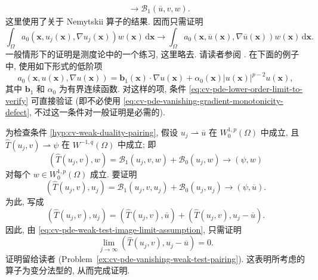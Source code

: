 \begin{Proof}
\[\begin{aligned}
&\to\mathcal{B}_1(\overline u,v,w).
\end{aligned}\]这里使用了关于 Nemytskii 算子的结果. 因而只需证明
\begin{equation}\label{eq:cv-pde-lower-order-limit-to-verify}
\int_\Omega a_0(\bm{x},u_j(\bm{x}),\nabla u_j(\bm{x}))w(\bm{x})\,\mathrm{d}\bm{x}\to\int_\Omega a_0(\bm{x},\overline u(\bm{x}),\nabla\overline u(\bm{x}))w(\bm{x})\,\mathrm{d}\bm{x}.
\end{equation}
一般情形下的证明是测度论中的一个练习, 这里略去. 请读者参阅 \cite[Lemma 2.2, p.~184]{Li}. 在下面的例子中, 使用如下形式的低阶项
\begin{equation}\label{eq:cv-pde-linear-drift-p-power-lower-order-term}
a_0(\bm{x},u(\bm{x}),\nabla u(\bm{x}))=\bm{b}_1(\bm{x})\cdot\nabla u(\bm{x})+\alpha_0(\bm{x})|u(\bm{x})|^{p-2}u(\bm{x}),
\end{equation}
其中 $\bm{b}_1$ 和 $\alpha_0$ 为有界连续函数. 对这样的项, 条件 \eqref{eq:cv-pde-lower-order-limit-to-verify} 可直接验证 (即不必使用 \eqref{eq:cv-pde-vanishing-gradient-monotonicity-defect}, 不过这一条件对一般证明是必需的).

为检查条件 \ref{hyp:cv-weak-duality-pairing}, 假设 $u_j\rightharpoonup\overline u$ 在 $W_0^{1,p}(\Omega)$ 中成立, 且 $\widehat T(u_j,v)\rightharpoonup\psi$ 在 $W^{-1,q}(\Omega)$ 中成立; 即
\begin{equation}\label{eq:cv-pde-weak-test-image-limit-assumption}
(\widehat T(u_j,v),w)=\mathcal{B}_1(u_j,v,w)+\mathcal{B}_0(u_j,w)\to(\psi,w)
\end{equation}
对每个 $w\in W_0^{1,p}(\Omega)$ 成立. 要证明
\begin{equation}\label{eq:cv-pde-weak-duality-pairing-limit-goal}
(\widehat T(u_j,v),u_j)=\mathcal{B}_1(u_j,v,u_j)+\mathcal{B}_0(u_j,u_j)\to(\psi,\overline u).
\end{equation}
为此, 写成
\begin{equation}\label{eq:cv-pde-weak-duality-pairing-splitting}
(\widehat T(u_j,v),u_j)=(\widehat T(u_j,v),\overline u)+(\widehat T(u_j,v),u_j-\overline u).
\end{equation}
因此, 由 \eqref{eq:cv-pde-weak-test-image-limit-assumption}, 只需证明
\begin{equation}\label{eq:cv-pde-vanishing-weak-test-pairing-exercise}
\lim_{j\to\infty}(\widehat T(u_j,v),u_j-\overline u)=0.
\end{equation}
证明留给读者 (Problem~\ref{ex:cv-pde-vanishing-weak-test-pairing}). 这表明所考虑的算子为变分法型的, 从而完成证明.
\end{Proof}
\endgroup
\endgroup

